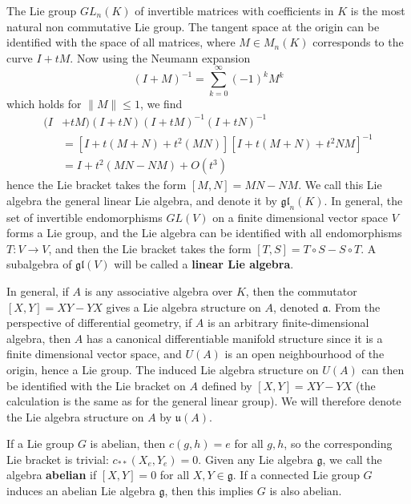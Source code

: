 \begin{example}
    The Lie group $GL_n(K)$ of invertible matrices with coefficients in $K$ is the most natural non commutative Lie group. The tangent space at the origin can be identified with the space of all matrices, where $M \in M_n(K)$ corresponds to the curve $I + tM$. Now using the Neumann expansion
    \[ (I + M)^{-1} = \sum_{k = 0}^\infty (-1)^k M^k \]
    which holds for $\| M \| \leq 1$, we find
    \begin{align*}
        (I& + tM)(I + tN)(I + tM)^{-1}(I + tN)^{-1}\\
        &= [I + t(M + N) + t^2(MN)][I + t(M + N) + t^2NM]^{-1}\\
        &= I + t^2(MN - NM) + O(t^3)
    \end{align*}
    hence the Lie bracket takes the form $[M,N] = MN - NM$. We call this Lie algebra the general linear Lie algebra, and denote it by $\mathfrak{gl}_n(K)$. In general, the set of invertible endomorphisms $GL(V)$ on a finite dimensional vector space $V$ forms a Lie group, and the Lie algebra can be identified with all endomorphisms $T: V \to V$, and then the Lie bracket takes the form $[T,S] = T \circ S - S \circ T$. A subalgebra of $\mathfrak{gl}(V)$ will be called a {\bf linear Lie algebra}.
\end{example}

\begin{example}
    In general, if $A$ is any associative algebra over $K$, then the commutator $[X,Y] = XY - YX$ gives a Lie algebra structure on $A$, denoted $\mathfrak{a}$. From the perspective of differential geometry, if $A$ is an arbitrary finite-dimensional algebra, then $A$ has a canonical differentiable manifold structure since it is a finite dimensional vector space, and $U(A)$ is an open neighbourhood of the origin, hence a Lie group. The induced Lie algebra structure on $U(A)$ can then be identified with the Lie bracket on $A$ defined by $[X,Y] = XY - YX$ (the calculation is the same as for the general linear group). We will therefore denote the Lie algebra structure on $A$ by $\mathfrak{u}(A)$.
\end{example}

\begin{example}
    If a Lie group $G$ is abelian, then $c(g,h) = e$ for all $g,h$, so the corresponding Lie bracket is trivial: $c_{**}(X_e,Y_e) = 0$. Given any Lie algebra $\mathfrak{g}$, we call the algebra {\bf abelian} if $[X,Y] = 0$ for all $X,Y \in \mathfrak{g}$. If a connected Lie group $G$ induces an abelian Lie algebra $\mathfrak{g}$, then this implies $G$ is also abelian.
\end{example}

